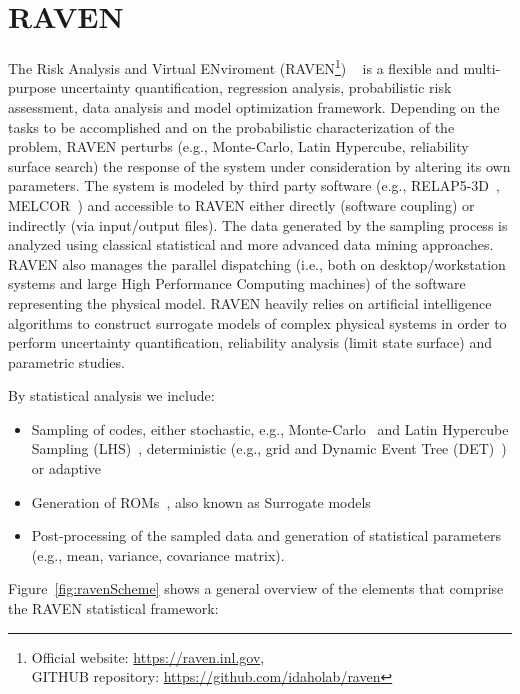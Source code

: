 \section{RAVEN}
\label{sec:raven}
 
The Risk Analysis and Virtual ENviroment 
(RAVEN\footnote{Official website: \url{https://raven.inl.gov},\\ 
GITHUB repository: \url{https://github.com/idaholab/raven}})
~\cite{RAVEN_PSAM_2014,alfonsiEsrel2014} 
is a flexible and multi-purpose uncertainty quantification, regression analysis, probabilistic
risk assessment, data analysis and model optimization framework. Depending on the tasks to be 
accomplished and on the probabilistic characterization of the problem, RAVEN perturbs 
(e.g., Monte-Carlo, Latin Hypercube, reliability surface search) the response of the system 
under consideration by altering its own parameters. The system is modeled by third party software 
(e.g., RELAP5-3D~\cite{relap5}, MELCOR~\cite{Melcor}) and accessible to RAVEN either directly 
(software coupling) or indirectly (via input/output files). 
The data generated by the sampling process is analyzed using 
classical statistical and more advanced data mining approaches. RAVEN also manages the parallel dispatching 
(i.e., both on desktop/workstation systems and large High Performance Computing machines) of the software 
representing the physical model. RAVEN heavily relies on artificial intelligence algorithms to construct 
surrogate models of complex physical systems in order to perform uncertainty quantification, reliability 
analysis (limit state surface) and parametric studies.

By statistical analysis we include:
\begin{itemize}
  \item Sampling of codes, either stochastic, e.g., Monte-Carlo~\cite{DynamicReliabilityMonteCarlo} 
        and Latin Hypercube Sampling (LHS)~\cite{LHShelton}, deterministic (e.g., grid and
        Dynamic Event Tree (DET)~\cite{AMENDOLAdylam,cojazziDylam}) or 
        adaptive~\cite{ANS_S_2014_raven_LS,mandelliSVMANS}
  \item Generation of ROMs~\cite{ROM_Khalik}, also known as Surrogate models
  \item Post-processing of the sampled data and generation of statistical parameters (e.g., mean, 
        variance, covariance matrix).
\end{itemize}

Figure~\ref{fig:ravenScheme} shows a general overview of the elements that comprise the RAVEN 
statistical framework:

